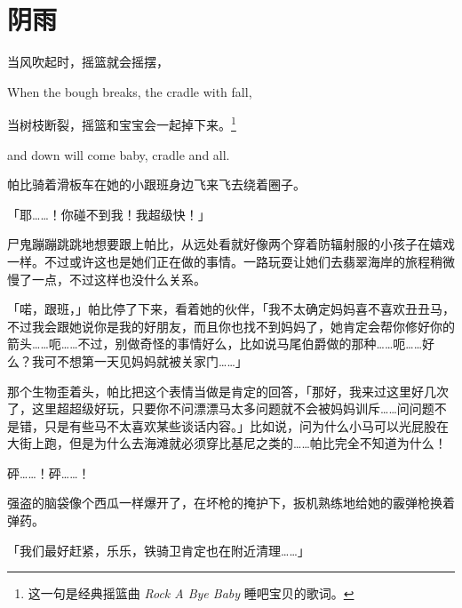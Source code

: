 \chapter{阴雨}


\begin{intro}
    当风吹起时，摇篮就会摇摆，
    
\begin{englishlyric}
    When the bough breaks, the cradle with fall,
\end{englishlyric}

    \medskip

    当树枝断裂，摇篮和宝宝会一起掉下来。\footnotespacefix\footnote{这一句是经典摇篮曲 \emph{Rock A Bye Baby} 睡吧宝贝的歌词。}

\begin{englishlyric}
    and down will come baby, cradle and all.
\end{englishlyric}
\end{intro}


帕比骑着滑板车在她的小跟班身边飞来飞去绕着圈子。

「耶……！你碰不到我！我超级快！」

尸鬼蹦蹦跳跳地想要跟上帕比，从远处看就好像两个穿着防辐射服的小孩子在嬉戏一样。不过或许这也是她们正在做的事情。一路玩耍让她们去翡翠海岸的旅程稍微慢了一点，不过这样也没什么关系。

「喏，跟班，」帕比停了下来，看着她的伙伴，「我不太确定妈妈喜不喜欢丑丑马，不过我会跟她说你是我的好朋友，而且你也找不到妈妈了，她肯定会帮你修好你的箭头……呃……不过，别做奇怪的事情好么，比如说马尾伯爵做的那种……呃……好么？我可不想第一天见妈妈就被关家门……」

那个生物歪着头，帕比把这个表情当做是肯定的回答，「那好，我来过这里好几次了，这里超超级好玩，只要你不问漂漂马太多问题就不会被妈妈训斥……问问题不是错，只是有些马不太喜欢某些谈话内容。」比如说，问为什么小马可以光屁股在大街上跑，但是为什么去海滩就必须穿比基尼之类的……帕比完全不知道为什么！

\horizonline


砰……！砰……！

强盗的脑袋像个西瓜一样爆开了，在坏枪的掩护下，扳机熟练地给她的霰弹枪换着弹药。

「我们最好赶紧，乐乐，铁骑卫肯定也在附近清理……」

